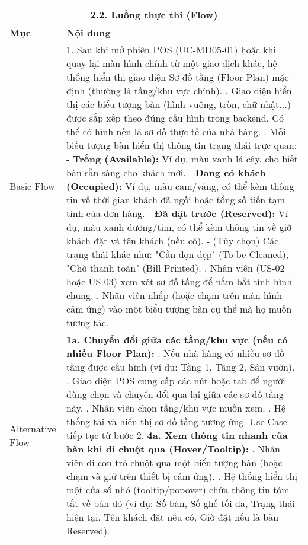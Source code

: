 \begin{longtable}{|m{4cm}|p{11cm}|}
\hline
\multicolumn{2}{|c|}{\textbf{2.2. Luồng thực thi (Flow)}} \\
\hline
\textbf{Mục} & \textbf{Nội dung} \\
\hline
Basic Flow & 1. Sau khi mở phiên POS (UC-MD05-01) hoặc khi quay lại màn hình chính từ một giao dịch khác, hệ thống hiển thị giao diện Sơ đồ tầng (Floor Plan) mặc định (thường là tầng/khu vực chính). \newline 2. Giao diện hiển thị các biểu tượng bàn (hình vuông, tròn, chữ nhật...) được sắp xếp theo đúng cấu hình trong backend. Có thể có hình nền là sơ đồ thực tế của nhà hàng. \newline 3. Mỗi biểu tượng bàn hiển thị thông tin trạng thái trực quan: \newline    - \textbf{Trống (Available):} Ví dụ, màu xanh lá cây, cho biết bàn sẵn sàng cho khách mới. \newline    - \textbf{Đang có khách (Occupied):} Ví dụ, màu cam/vàng, có thể kèm thông tin về thời gian khách đã ngồi hoặc tổng số tiền tạm tính của đơn hàng. \newline    - \textbf{Đã đặt trước (Reserved):} Ví dụ, màu xanh dương/tím, có thể kèm thông tin về giờ khách đặt và tên khách (nếu có). \newline    - (Tùy chọn) Các trạng thái khác như: "Cần dọn dẹp" (To be Cleaned), "Chờ thanh toán" (Bill Printed). \newline 4. Nhân viên (US-02 hoặc US-03) xem xét sơ đồ tầng để nắm bắt tình hình chung. \newline 5. Nhân viên nhấp (hoặc chạm trên màn hình cảm ứng) vào một biểu tượng bàn cụ thể mà họ muốn tương tác. \\
\hline
Alternative Flow & \textbf{1a. Chuyển đổi giữa các tầng/khu vực (nếu có nhiều Floor Plan):} \newline    1. Nếu nhà hàng có nhiều sơ đồ tầng được cấu hình (ví dụ: Tầng 1, Tầng 2, Sân vườn). \newline    2. Giao diện POS cung cấp các nút hoặc tab để người dùng chọn và chuyển đổi qua lại giữa các sơ đồ tầng này. \newline    3. Nhân viên chọn tầng/khu vực muốn xem. \newline    4. Hệ thống tải và hiển thị sơ đồ tầng tương ứng. Use Case tiếp tục từ bước 2. \newline \textbf{4a. Xem thông tin nhanh của bàn khi di chuột qua (Hover/Tooltip):} \newline    1. Nhân viên di con trỏ chuột qua một biểu tượng bàn (hoặc chạm và giữ trên thiết bị cảm ứng). \newline    2. Hệ thống hiển thị một cửa sổ nhỏ (tooltip/popover) chứa thông tin tóm tắt về bàn đó (ví dụ: Số bàn, Số ghế tối đa, Trạng thái hiện tại, Tên khách đặt nếu có, Giờ đặt nếu là bàn Reserved). \\

\end{longtable}
